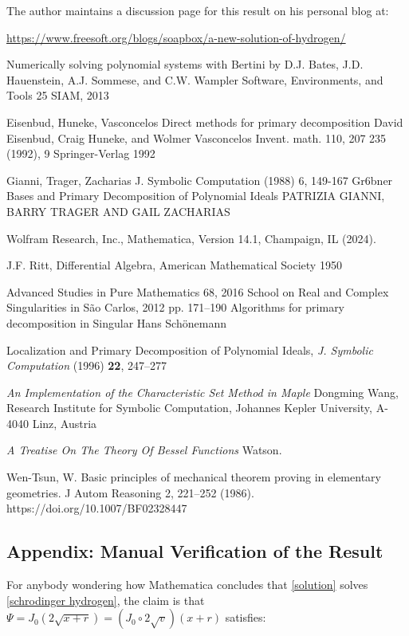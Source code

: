 \documentclass{article}
\begin{document}
The author maintains a discussion page for this result on his personal blog at:

\begin{center}
\small
\url{https://www.freesoft.org/blogs/soapbox/a-new-solution-of-hydrogen/}
\end{center}

\begin{thebibliography}{9}
Numerically solving polynomial systems with Bertini
by D.J. Bates, J.D. Hauenstein, A.J. Sommese, and C.W. Wampler
Software, Environments, and Tools 25
SIAM, 2013

 Eisenbud, Huneke, Vasconcelos
Direct methods for primary decomposition
David Eisenbud, Craig Huneke, and Wolmer Vasconcelos
Invent. math. 110, 207 235 (1992),
9 Springer-Verlag 1992

 Gianni, Trager, Zacharias
J. Symbolic Computation (1988) 6, 149-167
Gr6bner Bases and Primary Decomposition of
Polynomial Ideals
PATRIZIA GIANNI, BARRY TRAGER AND GAIL ZACHARIAS

Wolfram Research, Inc., Mathematica, Version 14.1, Champaign, IL (2024).

J.F. Ritt, Differential Algebra, American Mathematical Society 1950

Advanced Studies in Pure Mathematics 68, 2016
School on Real and Complex Singularities in São Carlos, 2012
pp. 171–190
Algorithms for primary decomposition in Singular
Hans Schönemann

 Localization and Primary Decomposition of Polynomial Ideals, {\it J. Symbolic Computation} (1996) {\bf 22}, 247–277

{\it An Implementation of the Characteristic Set Method in Maple}
Dongming Wang,
Research Institute for Symbolic Computation,
Johannes Kepler University, A-4040 Linz, Austria

{\it A Treatise On The Theory Of Bessel Functions}
Watson.

Wen-Tsun, W. Basic principles of mechanical theorem proving in elementary geometries. J Autom Reasoning 2, 221–252 (1986). https://doi.org/10.1007/BF02328447

\end{thebibliography}

\vfill\eject
\subsection*{Appendix: Manual Verification of the Result}
For anybody wondering how Mathematica concludes that \eqref{solution} solves \eqref{schrodinger hydrogen},
the claim is that $\Psi = J_0(2\sqrt{x+r}) = (J_0 \circ 2\sqrt{v}) (x+r)$ satisfies:
\end{document}
